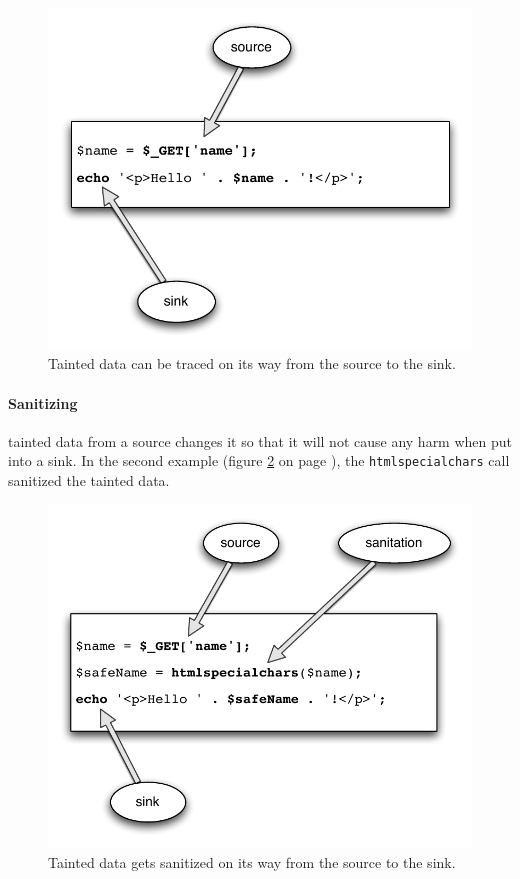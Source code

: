 \begin{figure}[!h]
  \includegraphics[scale=0.8]{images/taint}
  \caption{Tainted data can be traced on its way from the source to the sink.}
  \label{fig:taint}
\end{figure}

\paragraph{Sanitizing} tainted data from a source changes it so that it will not cause any harm when put into a sink. In the second example (figure \ref{fig:taint-and-clean} on page \pageref{fig:taint-and-clean}), the \texttt{htmlspecialchars} call sanitized the tainted data.

\begin{figure}[!h]
 \includegraphics[scale=0.8]{images/taint-and-clean}
 \caption{Tainted data gets sanitized on its way from the source to the sink.}
 \label{fig:taint-and-clean}
\end{figure}


